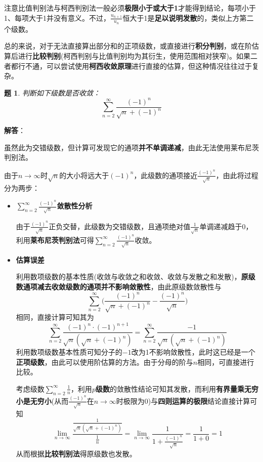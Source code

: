\documentclass[a4paper,UTF8,fontset=windows,AutoFakeBold]{ctexart}
\newcommand*{\suminf}[1][n=1]{\sum_{#1}^\infty}
\newcommand*{\note}{\noindent *}
\theoremstyle{ex}
\newtheorem{exercise}{题}
\newcommand{\sol}[1]{{\vspace{5pt}\kaishu\noindent\textbf{解答}：\vspace{-3pt}
\begin{compactitem}
    \item[] #1
\end{compactitem}
}}
\begin{document}
\note 注意比值判别法与柯西判别法一般必须\textbf{极限小于或大于1}才能得到结论，每项小于1、每项大于1并没有意义。不过，$\frac{u_{n+1}}{u_n}$恒大于1是\textbf{足以说明发散}的，类似上方第二个级数。

\note 总的来说，对于无法直接算出部分和的正项级数，或直接进行\textbf{积分判别}，或在阶估算后进行\textbf{比较判别}(柯西判别与比值判别均为其衍生，使用范围相对狭窄)。如果二者都行不通，可以尝试使用\textbf{柯西收敛原理}进行直接的估算，但这种情况往往过于复杂。

\begin{framed}
\begin{exercise}
    判断如下级数是否收敛：
    $$\suminf[n=2]\frac{(-1)^n}{\sqrt{n}+(-1)^n}$$
\end{exercise}
\sol{
    \note 虽然此为交错级数，但计算可发现它的通项\textbf{并不单调递减}，由此无法使用莱布尼茨判别法。 

    由于$n\to\infty$时$\sqrt{n}$的大小将远大于$(-1)^n$，此级数的通项接近$\frac{(-1)^n}{\sqrt{n}}$，由此将过程分为两步：
    \begin{itemize}
        \item $\suminf[n=2]\frac{(-1)^n}{\sqrt{n}}$\textbf{敛散性分析}
        
        由于$\frac{(-1)^n}{\sqrt{n}}$正负交替，此级数为交错级数，且通项绝对值$\frac{1}{\sqrt{n}}$单调递减趋于0，利用\textbf{莱布尼茨判别法}可得$\suminf[n=2]\frac{(-1)^n}{\sqrt{n}}$收敛。
        
        \item \textbf{估算误差}
        
        利用数项级数的基本性质(收敛与收敛之和收敛、收敛与发散之和发散)，\textbf{原级数通项减去收敛级数的通项并不影响敛散性}，由此原级数敛散性与
        $$\suminf[n=2]\bigg(\frac{(-1)^n}{\sqrt{n}+(-1)^n}-\frac{(-1)^n}{\sqrt{n}}\bigg)$$
        相同，直接计算可知其为
        $$\suminf[n=2]\frac{(-1)^n\cdot(-1)^{n+1}}{\sqrt{n}(\sqrt{n}+(-1)^n)}=\suminf[n=2]\frac{-1}{\sqrt{n}(\sqrt{n}+(-1)^n)}$$
        利用数项级数基本性质可知分子的$-1$改为1不影响敛散性，此时这已经是一个\textbf{正项级数}，由此可以使用阶估算的方法。由于分母的阶与$n$相同，可直接进行比较。

        考虑级数$\suminf[n=2]\frac{1}{n}$，利用\textbf{$p$级数}的敛散性结论可知其发散，而利用\textbf{有界量乘无穷小是无穷小}(从而$\frac{(-1)^n}{\sqrt{n}}$在$n\to\infty$时极限为0)与\textbf{四则运算的极限}结论直接计算可知
        $$\lim_{n\to\infty}\frac{\frac{1}{\sqrt{n}(\sqrt{n}+(-1)^n)}}{\frac{1}{n}}=\lim_{n\to\infty}\frac{1}{1+\frac{(-1)^n}{\sqrt{n}}}=\frac{1}{1+0}=1$$
        从而根据\textbf{比较判别法}得原级数也发散。
    \end{itemize}
}
\end{framed}
\end{document}

